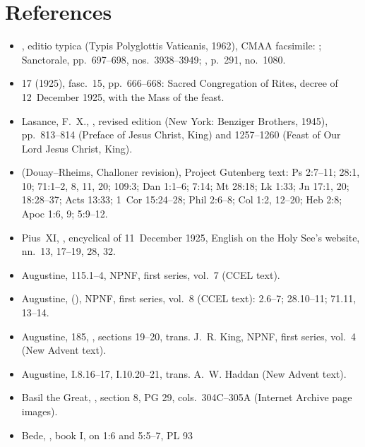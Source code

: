 \section{References}

{\footnotesize
\begin{itemize}[leftmargin=1.2em,itemsep=.15em]
\item {}, editio typica (Typis
Polyglottis Vaticanis, 1962), CMAA facsimile: ;
Sanctorale, pp.~697--698, nos.~3938--3949; , p.~291,
no.~1080.
\item {} 17 (1925), fasc.~15, pp.~666--668: Sacred
Congregation of Rites, decree  of 12~December 1925,
with the Mass of the feast.
\item Lasance, F.~X., , revised
edition (New York: Benziger Brothers, 1945), pp.~813--814 (Preface of Jesus
Christ, King) and 1257--1260 (Feast of Our Lord Jesus Christ, King).
\item {} (Douay--Rheims,
Challoner revision), Project Gutenberg text: Ps 2:7--11; 28:1, 10; 71:1--2,
8, 11, 20; 109:3; Dan 1:1--6; 7:14; Mt 28:18; Lk 1:33; Jn
17:1, 20; 18:28--37; Acts 13:33; 1~Cor 15:24--28; Phil 2:6--8; Col 1:2,
12--20; Heb 2:8; Apoc 1:6, 9; 5:9--12.
\item Pius~XI, , encyclical of 11~December 1925, English on
the Holy See's website, nn.~13, 17--19, 28, 32.
\item Augustine,  115.1--4, NPNF, first
series, vol.~7 (CCEL text).
\item Augustine,  (), NPNF, first series, vol.~8 (CCEL text): 2.6--7; 28.10--11;
71.11, 13--14.
\item Augustine,  185, ,
sections 19--20, trans. J.~R. King, NPNF, first series, vol.~4 (New Advent
text).
\item Augustine,  I.8.16--17, I.10.20--21, trans.
A.~W. Haddan (New Advent text).
\item Basil the Great, , section 8, PG 29,
cols.~304C--305A (Internet Archive page images).
\item Bede, , book I, on 1:6 and 5:5--7, PL 93

\end{itemize}}
